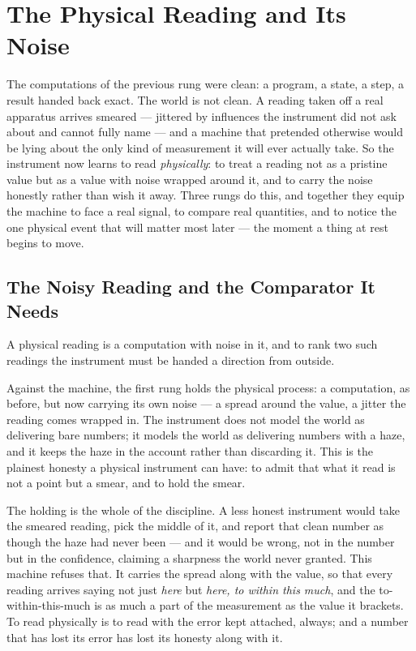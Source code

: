 \chapter{The Physical Reading and Its Noise}

The computations of the previous rung were clean: a program, a state, a step, a result handed back exact. The
world is not clean. A reading taken off a real apparatus arrives smeared --- jittered by influences the
instrument did not ask about and cannot fully name --- and a machine that pretended otherwise would be lying
about the only kind of measurement it will ever actually take. So the instrument now learns to read
\emph{physically}: to treat a reading not as a pristine value but as a value with noise wrapped around it, and to
carry the noise honestly rather than wish it away. Three rungs do this, and together they equip the machine to
face a real signal, to compare real quantities, and to notice the one physical event that will matter most later
--- the moment a thing at rest begins to move.

\section{The Noisy Reading and the Comparator It Needs}

A physical reading is a computation with noise in it, and to rank two such readings the instrument must be handed
a direction from outside.

Against the machine, the first rung holds the physical process: a computation, as before, but now carrying its
own noise --- a spread around the value, a jitter the reading comes wrapped in. The instrument does not model the
world as delivering bare numbers; it models the world as delivering numbers with a haze, and it keeps the haze in
the account rather than discarding it. This is the plainest honesty a physical instrument can have: to admit that
what it read is not a point but a smear, and to hold the smear.

The holding is the whole of the discipline. A less honest instrument would take the smeared reading, pick the
middle of it, and report that clean number as though the haze had never been --- and it would be wrong, not in
the number but in the confidence, claiming a sharpness the world never granted. This machine refuses that. It
carries the spread along with the value, so that every reading arrives saying not just \emph{here} but
\emph{here, to within this much}, and the to-within-this-much is as much a part of the measurement as the value
it brackets. To read physically is to read with the error kept attached, always; and a number that has lost its
error has lost its honesty along with it.

